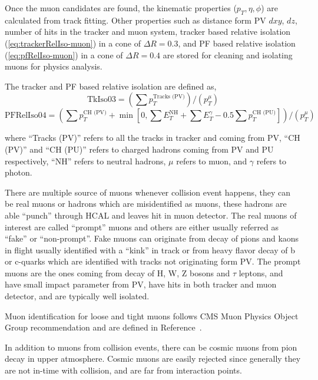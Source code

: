 Once the muon candidates are found,
the kinematic properties (\( p_T, \eta, \phi \))
are calculated from track fitting. Other properties such as distance form
\gls{PV} \( dxy \), \( dz \), number of hits in the tracker and muon system, tracker
based relative isolation (\ref{eq:trackerRelIso-muon}) in a cone of \( \Delta R = 0.3 \), and
\gls{PF} based relative isolation (\ref{eq:pfRelIso-muon})
in a cone of \( \Delta R = 0.4 \) are stored for cleaning and isolating muons for
physics analysis.

The tracker and \gls{PF} based relative isolation are defined as,
%
\begin{equation}\label{eq:trackerRelIso-muon}
  \text{TkIso03} = \left( \sum p_{T}^{\text{Tracks (PV)}} \right) /
  \left( p_{T}^{\mu} \right)
\end{equation}
%
\begin{equation}\label{eq:pfRelIso-muon}
  \text{PFRelIso04} = \left( \sum p_{T}^{\text{CH (PV)}}
  + \min \left[ 0, \sum E_{T}^{\text{NH}} + \sum E_{T}^{\gamma}
    - 0.5 \sum p_{T}^{\text{CH (PU)}} \right] \right) /
  \left( p_{T}^{\mu} \right)
\end{equation}

where ``Tracks (PV)'' refers to all the tracks in tracker and coming from \gls{PV},
``CH (PV)'' and ``CH (PU)'' refers to charged hadrons coming from \gls{PV} and \gls{PU}
respectively, ``NH'' refers to neutral hadrons, \( \mu \) refers to muon, and
\( \gamma \) refers to photon.

There are multiple source of muons whenever collision event happens, they can be
real muons or hadrons which are misidentified as muons, these hadrons
are able ``punch'' through \gls{HCAL} and leaves hit in muon detector. The real
muons of interest are called ``prompt'' muons and others are either usually referred
as ``fake'' or ``non-prompt''. Fake muons can originate from decay of pions and kaons in flight
usually identified with a ``kink'' in track or from heavy flavor decay of b or c-quarks
which are identified with tracks not originating form \gls{PV}.
The prompt muons are the ones coming from decay of H, W, Z bosons and \( \tau \) leptons,
and have small impact parameter from \gls{PV}, have hits in both tracker
and muon detector, and are typically well isolated.

Muon identification for loose and tight muons
follows \gls{CMS} Muon Physics Object Group
recommendation and are defined in Reference~\cite{cms-muon-id}.

In addition to muons from collision events, there can be cosmic muons from pion decay in
upper atmosphere. Cosmic muons are easily
rejected since generally they are not in-time with collision, and are far from
interaction points.

